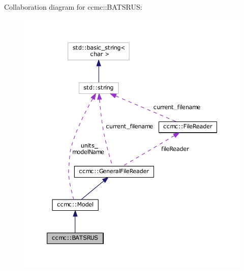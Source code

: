 Collaboration diagram for ccmc\-:\-:B\-A\-T\-S\-R\-U\-S\-:
\nopagebreak
\begin{figure}[H]
\begin{center}
\leavevmode
\includegraphics[width=350pt]{classccmc_1_1_b_a_t_s_r_u_s__coll__graph}
\end{center}
\end{figure}
